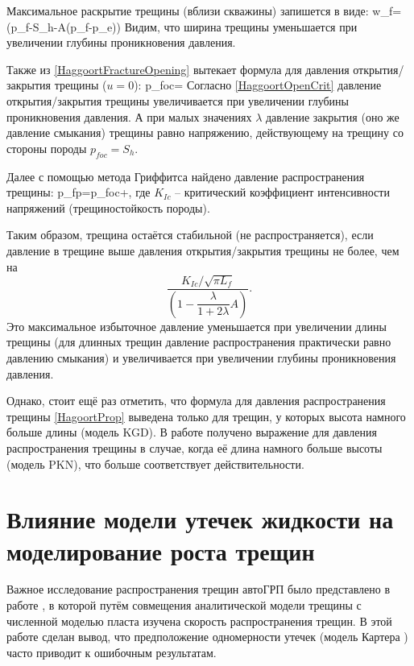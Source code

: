 Максимальное раскрытие трещины (вблизи скважины) запишется в виде:
\beq
w_{\!f}=\left(p_{\!f}-S_h-A\left(p_{\!f}-p_e\right)\right)
\eeq
Видим, что ширина трещины уменьшается при увеличении глубины проникновения давления.

Также из \eqref{HaggoortFractureOpening} вытекает формула для давления открытия/закрытия трещины ($u=0$):
\beq\label{HaggoortOpenCrit}
p_{\!f\!oc}=
\eeq
Согласно \eqref{HaggoortOpenCrit} давление открытия/закрытия трещины увеличивается при увеличении глубины проникновения давления.
А при малых значениях $\lambda$ давление закрытия (оно же давление смыкания) трещины равно напряжению, действующему на трещину со стороны породы $p_{\!f\!oc}=S_h$.

Далее с помощью метода Гриффитса \cite{griffith} найдено давление распространения трещины:
\beq\label{HagoortProp}
p_{\!f\!p}=p_{\!f\!oc}+,
\eeq
где $K_{Ic}$ -- критический коэффициент интенсивности напряжений (трещиностойкость породы).

Таким образом, трещина остаётся стабильной (не распространяется), если давление в трещине выше давления открытия/закрытия трещины не более, чем на
$$
\frac{K_{Ic}/\sqrt{\pi L_{\!f}}}{\left(1-\dfrac{\lambda}{1+2\lambda}A\right)}.
$$
Это максимальное избыточное давление уменьшается при увеличении длины трещины (для длинных трещин давление распространения практически равно давлению смыкания) и увеличивается при увеличении глубины проникновения давления.

Однако, стоит ещё раз отметить, что формула для давления распространения трещины \eqref{HagoortProp} выведена только для трещин, у которых высота намного больше длины (модель KGD).
В работе \cite{kabanova_shel} получено выражение для давления распространения трещины в случае, когда её длина намного больше высоты (модель PKN), что больше соответствует действительности.

\section{Влияние модели утечек жидкости на моделирование роста трещин}
\vspace*{-5mm}

Важное исследование распространения трещин автоГРП было представлено в работе \cite{hagoort}, в которой путём совмещения аналитической модели трещины с численной моделью пласта изучена скорость распространения трещин.
В этой работе сделан вывод, что предположение одномерности утечек (модель Картера \cite{karter}) часто приводит к ошибочным результатам.


